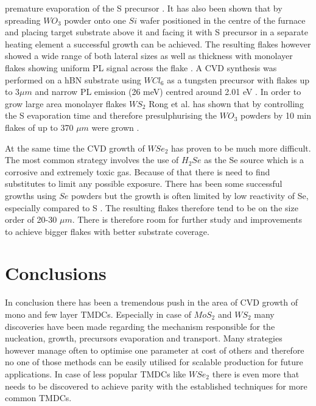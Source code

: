premature evaporation of the S precursor \cite{doi:10.1021/nn4046002}. It has also been shown that by spreading $WO_3$ powder onto one $Si$ wafer positioned in the centre of the furnace and placing target substrate above it and facing it with S precursor in a separate heating element a successful growth can be achieved. The resulting flakes however showed a wide range of both lateral sizes as well as thickness with monolayer flakes showing uniform PL signal across the flake \cite{Cong2013}.  A CVD synthesis was performed on a hBN substrate using $WCl_6$ as a tungsten precursor with flakes up to $3 \mu m$ and narrow PL emission (26 meV) centred around 2.01 eV \cite{doi:10.1021/nn503093k}. In order to grow large area monolayer flakes $WS_2$ Rong et al. has shown that by controlling the S evaporation time and therefore presulphurising the $WO_3$ powders by 10 min flakes of up to 370 $\mu m$ were grown \cite{Rong2014}.

At the same time the CVD growth of $WSe_2$ has proven to be much more difficult. The most common strategy involves the use of $H_2Se$ as the Se source which is a corrosive and extremely toxic gas. Because of that there is need to find substitutes to limit any possible exposure. There has been some successful growths using $Se$ powders but the growth is often limited by low reactivity of Se, especially compared to S \cite{Ahn2017}\cite{Hsu2017}\cite{Li2015}. The resulting flakes therefore tend to be on the size order of 20-30 $\mu m$. There is therefore room for further study and improvements to achieve bigger flakes with better substrate coverage.

\section{Conclusions}

In conclusion there has been a tremendous push in the area of CVD growth of mono and few layer TMDCs. Especially in case of $MoS_2$ and $WS_2$ many discoveries have been made regarding the mechanism responsible for the nucleation, growth, precursors evaporation and transport. Many strategies however manage often to optimise one parameter at cost of others and therefore no one of those methods can be easily utilised for scalable production for future applications. In case of less popular TMDCs like $WSe_2$ there is even more that needs to be discovered to achieve parity with the established techniques for more common TMDCs.